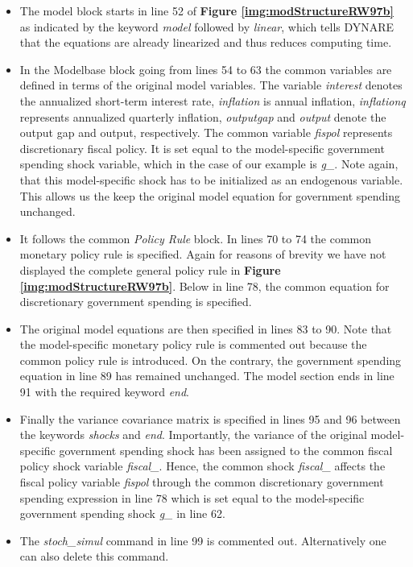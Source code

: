 \begin{itemize}
\item The model block starts in line 52 of {\bf Figure \ref{img:modStructureRW97b}} as indicated by the keyword \textit{model} followed
by \textit{linear}, which tells DYNARE that the equations are already linearized and thus reduces computing time.
\item In the Modelbase block going from lines 54 to 63 the common variables are defined in terms of the original model variables.
The variable \textit{interest} denotes the annualized short-term interest rate, \textit{inflation} is annual inflation,
\textit{inflationq} represents annualized quarterly inflation, \textit{outputgap} and \textit{output} denote the output gap and output, respectively.
The common variable \textit{fispol} represents discretionary fiscal policy. It is set equal to the model-specific government spending
shock variable, which in the case of our example is \textit{g\_}. Note again, that this model-specific shock has to be initialized
as an endogenous variable. This allows us the keep the original model equation for government spending unchanged.
\item It follows the common \textit{Policy Rule} block. In lines 70 to 74 the common monetary policy rule is specified.
Again for reasons of brevity we have not displayed the complete general policy rule in {\bf Figure \ref{img:modStructureRW97b}}.
Below in line 78, the common equation for discretionary government spending is specified.
\item The original model equations are then specified in lines 83 to 90. Note that the model-specific monetary policy rule is commented out because the common policy rule is introduced. On the contrary, the government spending equation in line 89 has remained unchanged.
The model section ends in line 91 with the required keyword \textit{end}.
\item Finally the variance covariance matrix is specified in lines 95 and 96 between the keywords \textit{shocks} and \textit{end}. Importantly, the variance of the original model-specific government spending shock has been assigned to the common fiscal policy shock variable \textit{fiscal\_}. Hence, the common shock \textit{fiscal\_} affects the fiscal policy variable \textit{fispol} through the common discretionary government spending expression in line 78 which is set equal to the model-specific government spending shock \textit{g\_} in line 62.
\item The \textit{stoch\_simul} command in line 99 is commented out. Alternatively one can also delete this command.
\end{itemize}

